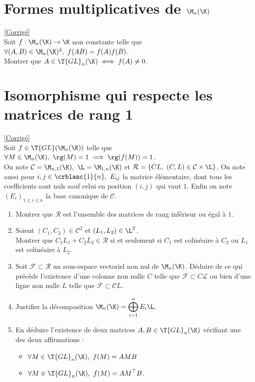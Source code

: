 \documentclass[8pt]{book}
\begin{document}
\section{Formes multiplicatives de $\M_n(\K)$ }
\label{Formes multiplicatives de M_n(K)}
\textcolor{blue}{\hyperref[Formes multiplicatives de M_n(K) corrigé]{[Corrigé]}}\\
Soit $f:\M_n(\K)\to \K$ non constante telle que $\forall (A,B)\in \M_n(\K)^2,\ f(AB)=f(A)f(B)$.\\
Montrer que $A\in \T{GL}_n(\K)\iff f(A)\ne 0$.

\section{Isomorphisme qui respecte les matrices de rang 1 }
\label{Isomorphisme qui respecte les matrices de rang 1}
\textcolor{blue}{\hyperref[Isomorphisme qui respecte les matrices de rang 1 corrigé]{[Corrigé]}}\\
Soit $f\in \T{GL}(\M_n(\K))$ telle que $\forall M\in \M_n(\K),\ \rg(M)=1\implies \rg(f(M))=1$.\\
On note $\mathcal C=\M_{n,1}(\K),\ \L=\M_{1,n}(\K)$ et $\mathcal R=\{CL,\ (C,L)\in \mathcal C\times\L\}$. On note aussi pour $i,j\in \crblanc{1}{n},\ E_{ij}$ la matrice élémentaire, dont tous les coefficients sont nuls sauf celui en position $(i,j)$ qui vaut $1$. Enfin on note $(E_i)_{1\leq i\leq n}$ la base canonique de $\mathcal C$.
\begin{enumerate}
	\item Montrer que $\mathcal R$ est l'ensemble des matrices de rang inférieur ou égal à $1$.
	\item Soient $(C_1,C_2)\in \mathcal C^2$ et $(L_1,L_2)\in \L^2$.\\
	Montrer que $C_1L_1+C_2L_2\in \mathcal R$ si et seulement si $C_1$ est colinéaire à $C_2$ ou $L_1$ est colinéaire à $L_2$.
	\item Soit $\mathcal F\subset \mathcal R$ un sous-espace vectoriel non nul de $\M_n(\K)$. Déduire de ce qui précède l'existence d'une colonne non nulle $C$ telle que $\mathcal F\subset C\mathcal L$ ou bien d'une ligne non nulle $L$ telle que $\mathcal F\subset \mathcal CL$.
	\item Justifier la décomposition $\M_n(\K)=\displaystyle\bigoplus_{i=1}^nE_i\L$.
	\item En déduire l'existence de deux matrices $A,B\in \T{GL}_n(\K)$ vérifiant une des deux affirmations :
	\begin{itemize}
		\item $\forall M\in \T{GL}_n(\K),\ f(M)=AMB$
		\item $\forall M\in \T{GL}_n(\K),\ f(M)=AM^\top B$.
	\end{itemize}
\end{enumerate}
\end{document}
